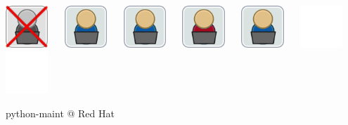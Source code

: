 \documentclass[1610,20pt]{beamer}
\newcommand\sk{\par\bigskip\bigskip\par}
\begin{document}
\begin{center}
\begin{frame}[fragile]
    \includegraphics[width=0.12\textwidth]{Join_OSDeveloper-x} ~~
    \includegraphics[width=0.12\textwidth]{Join_OSDeveloper} ~~
    \includegraphics[width=0.12\textwidth]{Join_OSDeveloper} ~~ 
    \includegraphics[width=0.12\textwidth]{Join_OSDeveloper-me} ~~
    \includegraphics[width=0.12\textwidth]{Join_OSDeveloper} ~~
    \includegraphics[width=0.12\textwidth]{Join_OSDeveloper-no} ~~
    \includegraphics[width=0.12\textwidth]{Join_OSDeveloper-no}
\end{frame}

\begin{frame}[fragile]
    python-maint @ Red Hat
    \sk


\end{frame}
\end{center}
\end{document}
